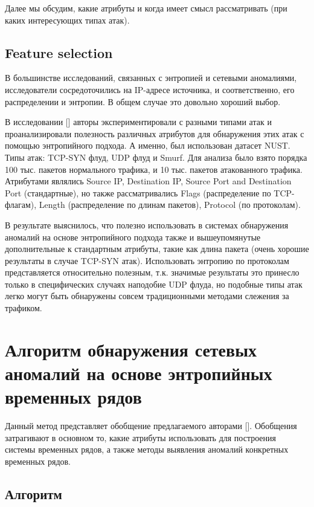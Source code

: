 \documentclass[]{interact}
\theoremstyle{plain}%
\theoremstyle{definition}
\theoremstyle{remark}
\begin{document}
 Далее мы обсудим, какие атрибуты и когда имеет смысл рассматривать (при каких интересующих типах атак).


\subsection{Feature selection}
В большинстве исследований, связанных с энтропией и сетевыми аномалиями, исследователи сосредоточились на IP-адресе источника, и соответственно, его распределении и энтропии. В общем случае это довольно хороший выбор.

В исследовании [\cite{Sah15}] авторы экспериментировали с разными типами атак и проанализировали полезность различных атрибутов для обнаружения этих атак с помощью энтропийного подхода. А именно, был использован датасет NUST. Типы атак: TCP-SYN флуд, UDP флуд и Smurf. Для анализа было взято порядка 100 тыс. пакетов нормального трафика, и 10 тыс. пакетов атакованного трафика. Атрибутами являлись Source IP, Destination IP, Source Port and Destination Port (стандартные), но также рассматривались Flags (распределение по TCP-флагам), Length (распределение по длинам пакетов), Protocol (по протоколам).

В результате выяснилось, что полезно использовать в системах обнаружения аномалий на основе энтропийного подхода также и вышеупомянутые дополнительные к стандартным атрибуты, такие как длина пакета (очень хорошие результаты в случае TCP-SYN атак). Использовать энтропию по протоколам представляется относительно полезным, т.к. значимые результаты это принесло только в специфических случаях наподобие UDP флуда, но подобные типы атак легко могут быть обнаружены совсем традиционными методами слежения за трафиком.



\section{Алгоритм обнаружения сетевых аномалий на основе энтропийных временных рядов}

Данный метод представляет обобщение предлагаемого авторами [\cite{Win11}]. Обобщения затрагивают в основном то, какие атрибуты использовать для построения системы временных рядов, а также методы выявления аномалий конкретных временных рядов.

\subsection{Алгоритм}
\end{document}
